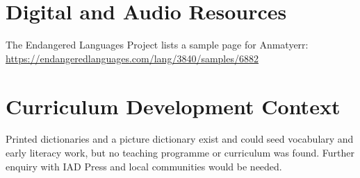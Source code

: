 \documentclass[12pt]{article}
\begin{document}
\section{Digital and Audio Resources}
The Endangered Languages Project lists a sample page for Anmatyerr: \url{https://endangeredlanguages.com/lang/3840/samples/6882}

\section{Curriculum Development Context}
Printed dictionaries and a picture dictionary exist and could seed vocabulary and early literacy work, but no teaching programme or curriculum was found. Further enquiry with IAD Press and local communities would be needed.
\end{document}
